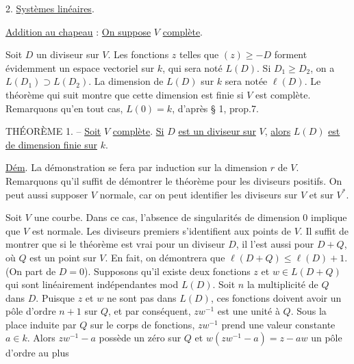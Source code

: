 2. \uline{Systèmes linéaires}.

\uline{Addition au chapeau} : \uline{On suppose} $V$ \uline{complète}.

Soit $D$ un diviseur sur $V$. Les fonctions $z$ telles que $(z)\geq-D$ forment évidemment un espace vectoriel sur $k$, qui sera noté $L(D)$. Si $D_1\geq D_2$, on a $L(D_1)\supset L(D_2)$. La dimension de $L(D)$ sur $k$ sera notée $\ell(D)$. Le théorème qui suit montre que cette dimension est finie si $V$ est complète. Remarquons qu'en tout cas, $L(0)=k$, d'après § 1, prop.7.

THÉORÈME 1. -- \uline{Soit} $V$ \uline{complète}. \uline{Si} $D$ \uline{est un diviseur sur} $V$, \uline{alors} $L(D)$ \uline{est de dimension finie sur} $k$.

\uline{Dém}. La démonstration se fera par induction sur la dimension $r$ de $V$. Remarquons qu'il suffit de démontrer le théorème pour les diviseurs positifs. On peut aussi supposer $V$ normale, car on peut identifier les diviseurs sur $V$ et sur $V^*$.

Soit $V$ une courbe. Dans ce cas, l'absence de singularités de dimension $0$ implique que $V$ est normale. Les diviseurs premiers s'identifient aux points de $V$. Il suffit de montrer que si le théorème est vrai pour un diviseur $D$, il l'est aussi pour $D+Q$, où $Q$ est un point sur $V$. En fait, on démontrera que $\ell(D+Q)\leq\ell(D)+1$. (On part de $D=0$). Supposons qu'il existe deux fonctions $z$ et $w\in L(D+Q)$ qui sont linéairement indépendantes mod $L(D)$. Soit $n$ la multiplicité de $Q$ dans $D$. Puisque $z$ et $w$ ne sont pas dans $L(D)$, ces fonctions doivent avoir un pôle d'ordre $n+1$ sur $Q$, et par conséquent, $zw^{-1}$ est une unité à $Q$. Sous la place induite par $Q$ sur le corps de fonctions, $zw^{-1}$ prend une valeur constante $a\in k$. Alors $zw^{-1}-a$ possède un zéro sur $Q$ et $w(zw^{-1}-a)=z-aw$ un pôle d'ordre au plus

